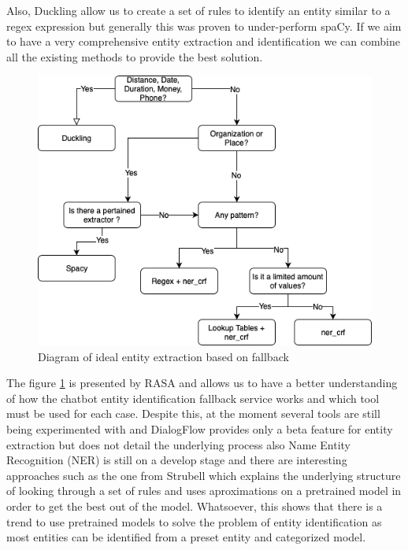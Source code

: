 Also, Duckling allow us to create a set of rules to identify an entity similar to a regex expression but generally this was proven to under-perform spaCy. If we aim to have a very comprehensive entity extraction and identification we can combine all the existing methods to provide the best solution. 

\begin{figure}[!ht]
    \centering
    \includegraphics[scale=0.80]{MA-BA-Thesis/entity_extraction.png}
    \caption{Diagram of ideal entity extraction based on fallback}
    \label{fig:entityExtraction}
\end{figure}

The figure \ref{fig:entityExtraction} is presented by RASA and allows us to have a better understanding of how the chatbot entity identification fallback service works and which tool must be used for each case. Despite this, at the moment several tools are still being experimented with and DialogFlow provides only a beta feature for entity extraction but does not detail the underlying process also Name Entity Recognition (NER) is still on a develop stage and there are interesting approaches such as the one from Strubell \cite{NER} which explains the underlying structure of looking through a set of rules and uses aproximations on a pretrained model in order to get the best out of the model. Whatsoever, this shows that there is a trend to use pretrained models to solve the problem of entity identification as most entities can be identified from a preset entity and categorized model.

